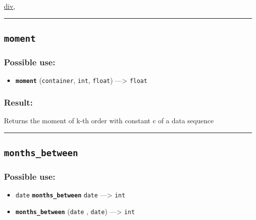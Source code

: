 \documentclass[]{book}
\providecommand{\tightlist}{%
  \setlength{\itemsep}{0pt}\setlength{\parskip}{0pt}}
\theoremstyle{definition}
\theoremstyle{definition}
\theoremstyle{definition}
\theoremstyle{remark}
\begin{document}
\href{OperatorsDH\#div}{div},

\begin{center}\rule{0.5\linewidth}{\linethickness}\end{center}

\subsection{\texorpdfstring{\texttt{moment}}{moment}}\label{moment}

\subsubsection{Possible use:}\label{possible-use-361}

\begin{itemize}
\tightlist
\item
  \textbf{\texttt{moment}} (\texttt{container}, \texttt{int},
  \texttt{float}) ---\textgreater{} \texttt{float}
\end{itemize}

\subsubsection{Result:}\label{result-350}

Returns the moment of k-th order with constant c of a data sequence

\begin{center}\rule{0.5\linewidth}{\linethickness}\end{center}

\subsection{\texorpdfstring{\texttt{months\_between}}{months\_between}}\label{months_between}

\subsubsection{Possible use:}\label{possible-use-362}

\begin{itemize}
\tightlist
\item
  \texttt{date} \textbf{\texttt{months\_between}} \texttt{date}
  ---\textgreater{} \texttt{int}
\item
  \textbf{\texttt{months\_between}} (\texttt{date} , \texttt{date})
  ---\textgreater{} \texttt{int}
\end{itemize}
\end{document}
